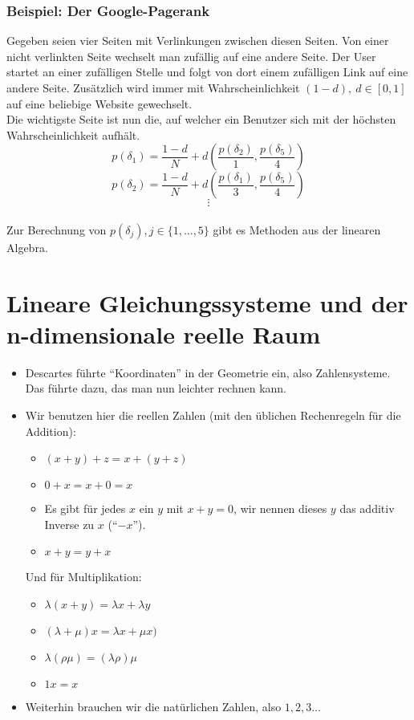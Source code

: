 \documentclass{report}
\newcommand{\lb}{\lambda}
\theoremstyle{customrem}
\theoremstyle{customdef}
\theoremstyle{customenv}
\begin{document}
	\subsection*{Beispiel: Der Google-Pagerank}
	Gegeben seien vier Seiten mit Verlinkungen zwischen diesen Seiten. Von einer nicht verlinkten Seite wechselt man zufällig auf eine andere Seite. Der User startet an einer zufälligen Stelle und folgt von dort einem zufälligen Link auf eine andere Seite. Zusätzlich wird immer mit Wahrscheinlichkeit \((1-d), \ d \in [0, 1]\) auf eine beliebige Website gewechselt.\\
	Die wichtigste Seite ist nun die, auf welcher ein Benutzer sich mit der höchsten Wahrscheinlichkeit aufhält.\\
	\[
	p(\delta_1) = \frac{1-d}{N} + d\left(\frac{p(\delta_2)}{1}, \frac{p(\delta_5)}{4}\right)\]\[
	p(\delta_2) = \frac{1-d}{N} + d\left(\frac{p(\delta_1)}{3}, \frac{p(\delta_5)}{4}\right)\]\[
	\vdots
	\]\\
	Zur Berechnung von \(p(\delta_j), j \in \{1, \ldots, 5\}\) gibt es Methoden aus der linearen Algebra.
	\newpage
	\tableofcontents
	\newpage
	\chapter[Lineare Gleichungssysteme und der n-dimensionale reelle Raum]{Lineare Gleichungssysteme und der \\ n-dimensionale reelle Raum}
	
	\begin{itemize}
		\item Descartes führte "`Koordinaten"' in der Geometrie ein, also Zahlensysteme. Das führte dazu, das man nun leichter rechnen kann.
		\item Wir benutzen hier die reellen Zahlen (mit den üblichen Rechenregeln für die Addition):
		\begin{itemize}
			\item \((x + y) + z = x + (y + z)\) 
			\item \(0 + x = x + 0 = x\) 
			\item Es gibt für jedes \(x\) ein \(y\) mit \(x + y = 0\), wir nennen dieses \(y\) das additiv Inverse zu \(x\) ("`\(-x\)"').
			\item \(x + y = y + x\)
		\end{itemize}
		Und für Multiplikation:
		\begin{itemize}
			\item \(\lambda (x + y) = \lambda x + \lambda y\) 
			\item \((\lambda + \mu) x = \lambda x + \mu x)\)
			\item \(\lb(\rho\mu)=(\lb\rho)\mu\)
			\item \(1x = x\)
		\end{itemize}
		\item Weiterhin brauchen wir die natürlichen Zahlen, also \(1,2,3\dots\)
	\end{itemize}
	
\end{document}
